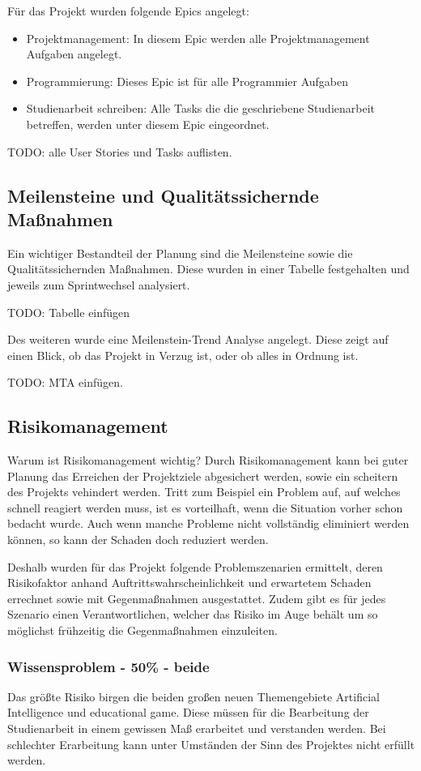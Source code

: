 Für das Projekt wurden folgende Epics angelegt:

\begin{itemize}
\item Projektmanagement: In diesem Epic werden alle Projektmanagement Aufgaben angelegt.
\item Programmierung: Dieses Epic ist für alle Programmier Aufgaben
\item Studienarbeit schreiben: Alle Tasks die die geschriebene Studienarbeit betreffen, werden unter diesem Epic eingeordnet.
\end{itemize}

TODO: alle User Stories und Tasks auflisten.

\subsection{Meilensteine und Qualitätssichernde Maßnahmen}

Ein wichtiger Bestandteil der Planung sind die Meilensteine sowie die Qualitätssichernden Maßnahmen. Diese wurden in einer Tabelle festgehalten und jeweils zum Sprintwechsel analysiert. 

TODO: Tabelle einfügen

Des weiteren wurde eine Meilenstein-Trend Analyse angelegt. Diese zeigt auf einen Blick, ob das Projekt in Verzug ist, oder ob alles in Ordnung ist.

TODO: MTA einfügen.

\subsection{Risikomanagement}
Warum ist Risikomanagement wichtig? Durch Risikomanagement kann bei guter Planung das Erreichen der Projektziele abgesichert werden, sowie ein scheitern des Projekts vehindert werden. Tritt zum Beispiel ein Problem auf, auf welches schnell reagiert werden muss, ist es vorteilhaft, wenn die Situation vorher schon bedacht wurde. Auch wenn manche Probleme nicht vollständig eliminiert werden können, so kann der Schaden doch reduziert werden.

Deshalb wurden für das Projekt folgende Problemszenarien ermittelt, deren Risikofaktor anhand Auftrittswahrscheinlichkeit und erwartetem Schaden errechnet sowie mit Gegenmaßnahmen ausgestattet. Zudem gibt es für jedes Szenario einen Verantwortlichen, welcher das Risiko im Auge behält um so möglichst frühzeitig die Gegenmaßnahmen einzuleiten. 

\subsubsection{Wissensproblem - 50\% - beide}
Das größte Risiko birgen die beiden großen neuen Themengebiete Artificial Intelligence und educational game. Diese müssen für die Bearbeitung der Studienarbeit in einem gewissen Maß erarbeitet und verstanden werden. Bei schlechter Erarbeitung kann unter Umständen der Sinn des Projektes nicht erfüllt werden.

